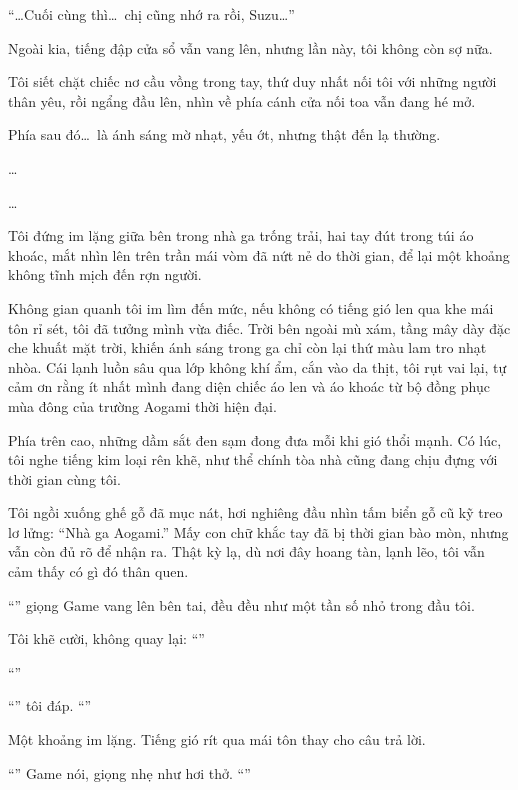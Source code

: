 \documentclass[../main.tex]{subfiles}
\begin{document}
``\dots Cuối cùng thì\dots\ chị cũng nhớ ra rồi, Suzu\dots''

Ngoài kia, tiếng đập cửa sổ vẫn vang lên, nhưng lần này, tôi không còn sợ nữa.

Tôi siết chặt chiếc nơ cầu vồng trong tay, thứ duy nhất nối tôi với những người thân yêu, rồi ngẩng đầu lên, nhìn về phía cánh cửa nối toa vẫn đang hé mở.

Phía sau đó\dots\ là ánh sáng mờ nhạt, yếu ớt, nhưng thật đến lạ thường.

\dots

\dots


Tôi đứng im lặng giữa bên trong nhà ga trống trải, hai tay đút trong túi áo khoác, mắt nhìn lên trên trần mái vòm đã nứt nẻ do thời gian, để lại một khoảng không tĩnh mịch đến rợn người.

Không gian quanh tôi im lìm đến mức, nếu không có tiếng gió len qua khe mái tôn rỉ sét, tôi đã tưởng mình vừa điếc. Trời bên ngoài mù xám, tầng mây dày đặc che khuất mặt trời, khiến ánh sáng trong ga chỉ còn lại thứ màu lam tro nhạt nhòa. Cái lạnh luồn sâu qua lớp không khí ẩm, cắn vào da thịt, tôi rụt vai lại, tự cảm ơn rằng ít nhất mình đang diện chiếc áo len và áo khoác từ bộ đồng phục mùa đông của trường Aogami thời hiện đại.

Phía trên cao, những dầm sắt đen sạm đong đưa mỗi khi gió thổi mạnh. Có lúc, tôi nghe tiếng kim loại rên khẽ, như thể chính tòa nhà cũng đang chịu đựng với thời gian cùng tôi.

Tôi ngồi xuống ghế gỗ đã mục nát, hơi nghiêng đầu nhìn tấm biển gỗ cũ kỹ treo lơ lửng: ``Nhà ga Aogami.'' Mấy con chữ khắc tay đã bị thời gian bào mòn, nhưng vẫn còn đủ rõ để nhận ra. Thật kỳ lạ, dù nơi đây hoang tàn, lạnh lẽo, tôi vẫn cảm thấy có gì đó thân quen.

``'' giọng Game vang lên bên tai, đều đều như một tần số nhỏ trong đầu tôi.

Tôi khẽ cười, không quay lại: ``''

``''

``'' tôi đáp. ``''

Một khoảng im lặng. Tiếng gió rít qua mái tôn thay cho câu trả lời.

``'' Game nói, giọng nhẹ như hơi thở. ``''
\end{document}

